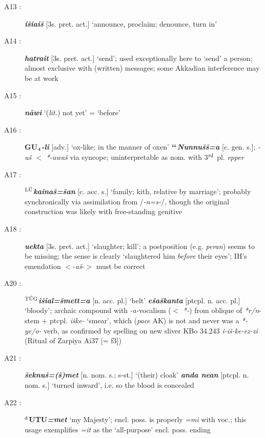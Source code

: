 \documentclass[10pt]{article}
\newcommand{\supersc}[1]{$^{\textrm{\scriptsize{#1}}}$}  	%
\newcommand{\subsc}[1]{$_{\textrm{\scriptsize{#1}}}$}	%
\newcommand{\bit}[1]{\textbf{\textit{#1}}}				%
\newcommand{\p}[1]{{\tiny[{#1}]}}					%
\newcommand{\hith}{\textsubwedge{h}}
\newcommand{\man}{\supersc{L\'U}}
\newcommand{\cloth}{\supersc{T\'UG}}
\renewcommand{\.}[1]{\textsubdot{#1}}
\begin{document}
\begin{description}
\item[A13 :] \bit{i\v{s}ia{\hith\hith}i\v{s}} \p{3s. pret. act.} `announce, proclaim; denounce, turn in'

\item[A14 :] \bit{hatrait} \p{3s. pret. act.} `send'; used exceptionally here to `send' a person; almost exclusive with (written) messages; some Akkadian interference may be at work

\item[A15 :] \bit{n\=awi} `(\textit{lit.}) not yet' = `before'

\item[A16 :] \textbf{GU\subsc{4}}\bit{-li} \p{adv.} `ox-like; in the manner of oxen' \bit{\textit{\supersc{m}}Nunnu\v{s}\v{s}=a} \p{c. gen. s.}; \textit{-u\v{s} $<$ *-uwa\v{s}} via syncope; uninterpretable as nom. with 3\supersc{rd} pl. \textit{epper}

\item[A17 :] \bit{\textit{\man}kaina\v{s}=\v{s}an} \p{c. acc. s.} `family; kith, relative by marriage'; probably synchronically via assimilation from /{\it-n=s-}/, though the original construction was likely with free-standing genitive

\item[A18 :] \bit{{\hith}uekta} \p{3s. pret. act.} `slaughter; kill'; a postposition (e.g. \textit{peran}) seems to be missing; the sense is clearly `slaughtered him \textit{before} their eyes'; IH's emendation $<$-\textit{a\v{s}}-$>$ must be correct

\item[A20 :] \bit{\textit{\cloth}i\v{s}{\hith}ial=\v{s}mett=a} \p{n. acc. pl.} `belt' \bit{e\v{s}{\hith}a\v{s}kanta} \p{ptcpl. n. acc. pl.} `bloody'; archaic compound with \textit{-a-}vocalism ($<$ \textit{*-}) from oblique of \textit{*r/n}-stem + ptcpl. \textit{i\v{s}ke-} `smear', which (\textit{pace} AK) is not and never was a \textit{*-ye/o-} verb, as confirmed by spelling on new sliver KBo 34.243 \textit{i-i\v{s}-ke-ez-zi} (Ritual of Zarpiya Ai37 [= f3]) 

\item[A21 :] \bit{\v{s}eknu\v{s}=(\v{s})met} \p{n. nom. s.; s-st.} `(their) cloak' \bit{anda nean} \p{ptcpl. n. nom. s.} `turned inward', i.e. so the blood is concealed

\item[A22 :] \textbf{\supersc{d}UTU}\bit{=met} `my Majesty'; encl. poss. is properly \textit{=mi} with voc.; this usage exemplifies \textit{=it} as the `all-purpose' encl. poss. ending


\end{description}
\end{document}
